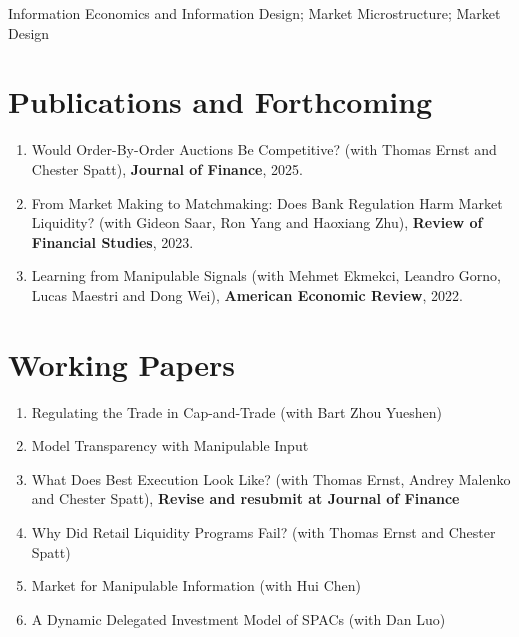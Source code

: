 \documentclass[11pt]{article}
\begin{document}
Information Economics and Information Design; Market Microstructure; Market Design


\section*{Publications and Forthcoming}
\label{pubs}

\begin{enumerate}
  \item Would Order-By-Order Auctions Be Competitive? (with Thomas Ernst and Chester Spatt), \textbf{Journal of Finance}, 2025.
  \item From Market Making to Matchmaking: Does Bank Regulation Harm Market Liquidity? (with Gideon Saar, Ron Yang and Haoxiang Zhu), \textbf{Review of Financial Studies}, 2023.
  \item Learning from Manipulable Signals (with Mehmet Ekmekci, Leandro Gorno, Lucas Maestri and Dong Wei), \textbf{American Economic Review}, 2022.
\end{enumerate}


\section*{Working Papers}
\label{working papers}

\begin{enumerate}
  \item Regulating the Trade in Cap-and-Trade (with Bart Zhou Yueshen)
  \item Model Transparency with Manipulable Input
  \item What Does Best Execution Look Like? (with Thomas Ernst, Andrey Malenko and Chester Spatt), \textbf{Revise and resubmit at Journal of Finance}
  \item Why Did Retail Liquidity Programs Fail? (with Thomas Ernst and Chester Spatt)
  \item Market for Manipulable Information (with Hui Chen)
  \item A Dynamic Delegated Investment Model of SPACs (with Dan Luo)
\end{enumerate}


\end{document}
